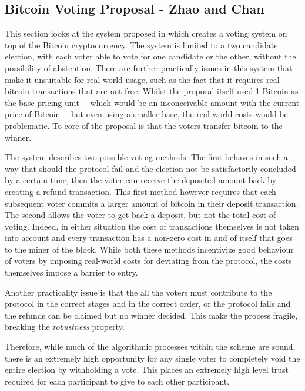 \subsection{Bitcoin Voting Proposal - Zhao and Chan}

This section looks at the system proposed in \cite{zhaoHowVotePrivately2016} which creates a voting system on top of the Bitcoin cryptocurrency. The system is limited to a two candidate election, with each voter able to vote for one candidate or the other, without the possibility of abstention. There are further practically issues in this system that make it unsuitable for real-world usage, such as the fact that it requires real bitcoin transactions that are not free. Whilst the proposal itself used 1 Bitcoin as the base pricing unit ---which would be an inconceivable amount with the current price of Bitcoin--- but even using a smaller base, the real-world costs would be problematic. To core of the proposal is that the voters transfer bitcoin to the winner.

The system describes two possible voting methods. The first behaves in such a way that should the protocol fail and the election not be satisfactorily concluded by a certain time, then the voter can receive the deposited amount back by creating a refund transaction. This first method however requires that each subsequent voter commits a larger amount of bitcoin in their deposit transaction. The second allows the voter to get back a deposit, but not the total cost of voting. Indeed, in either situation the cost of transactions themselves is not taken into account and every transaction has a non-zero cost in and of itself that goes to the miner of the block. While both these methods incentivize good behaviour of voters by imposing real-world costs for deviating from the protocol, the costs themselves impose a barrier to entry.

Another practicality issue is that the all the voters must contribute to the protocol in the correct stages and in the correct order, or the protocol fails and the refunds can be claimed but no winner decided. This make the process fragile, breaking the \emph{robustness} property.

Therefore, while much of the algorithmic processes within the scheme are sound, there is an extremely high opportunity for any single voter to completely void the entire election by withholding a vote. This places an extremely high level trust required for each participant to give to each other participant.

